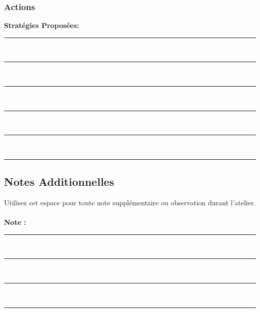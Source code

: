 \documentclass[parskip=full]{scrartcl}
\begin{document}
\begin{multicols}{2}
\begin{minipage}[t]{0.45\textwidth}
        \subsubsection*{Actions}
        \textbf{Stratégies Proposées:} \\
        \textcolor{lightgray}{\rule{\textwidth}{0.1pt}} \\
        \textcolor{lightgray}{\rule{\textwidth}{0.1pt}} \\
        \textcolor{lightgray}{\rule{\textwidth}{0.1pt}} \\
        \textcolor{lightgray}{\rule{\textwidth}{0.1pt}} \\
        \textcolor{lightgray}{\rule{\textwidth}{0.1pt}} \\
        \textcolor{lightgray}{\rule{\textwidth}{0.1pt}}

        \subsection*{Notes Additionnelles}
        Utilisez cet espace pour toute note supplémentaire ou observation durant l'atelier.\\
        \\
        \textbf{Note :} \textcolor{lightgray}{\rule{0.9\textwidth}{0.1pt}} \\
        \textcolor{lightgray}{\rule{\textwidth}{0.1pt}} \\
        \textcolor{lightgray}{\rule{\textwidth}{0.1pt}} \\
        \textcolor{lightgray}{\rule{\textwidth}{0.1pt}}
    \end{minipage}
\end{multicols}
\end{document}
